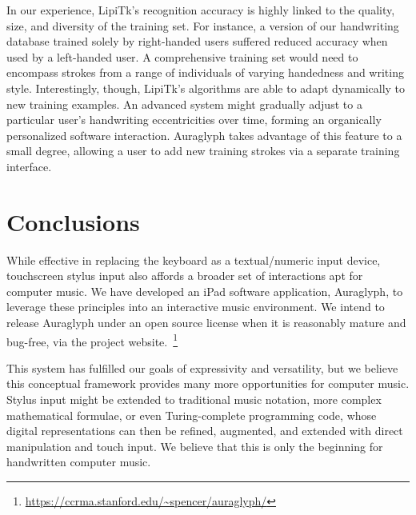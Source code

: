 \documentclass{nime-alternate}
\begin{document}
In our experience, LipiTk's recognition accuracy is highly linked to the quality, size, and diversity of the training set. 
For instance, a version of our handwriting database trained solely by right-handed users suffered reduced accuracy when used by a left-handed user. 
A comprehensive training set would need to encompass strokes from a range of individuals of varying handedness and writing style. 
Interestingly, though, LipiTk's algorithms are able to adapt dynamically to new training examples. 
An advanced system might gradually adjust to a particular user's handwriting eccentricities over time, forming an organically personalized software interaction. 
Auraglyph takes advantage of this feature to a small degree, allowing a user to add new training strokes via a separate training interface. 

\section{Conclusions}
\label{sec:Conclusions}

While effective in replacing the keyboard as a textual/numeric input device, touchscreen stylus input also affords a broader set of interactions apt for computer music. 
We have developed an iPad software application, Auraglyph, to leverage these principles into an interactive music environment. 
We intend to release Auraglyph under an open source license when it is reasonably mature and bug-free, via the project website.~\footnote{\url{https://ccrma.stanford.edu/~spencer/auraglyph/}}

This system has fulfilled our goals of expressivity and versatility, but we believe this conceptual framework provides many more opportunities for computer music. 
Stylus input might be extended to traditional music notation, more complex mathematical formulae, or even Turing-complete programming code, whose digital representations can then be refined, augmented, and extended with direct manipulation and touch input. 
We believe that this is only the beginning for handwritten computer music. 


%

%
%


\end{document}
